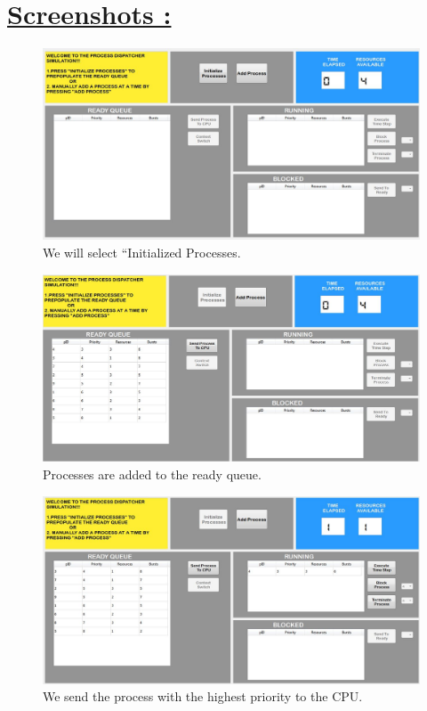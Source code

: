 \documentclass{article}
\begin{document}
\newpage
\section*{{\underline{\huge {Screenshots :}}  }}
\begin{figure}[H]
 \centering
 \includegraphics[width=\linewidth]{ss1.JPG}
 \caption{We will select ``Initialized Processes.}
\end{figure}

\begin{figure}[H]
 \centering
 \includegraphics[height = 9 cm]{ss2.JPG}
 \caption{Processes are added to the ready queue.}
\end{figure}

\begin{figure}[H]
 \centering
 \includegraphics[height = 9 cm]{ss3.JPG}
 \caption{We send the process with the highest priority to the CPU.}
\end{figure}
\end{document}
